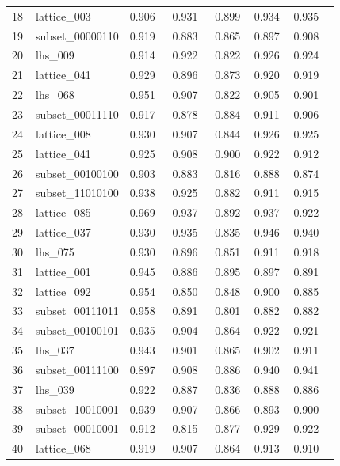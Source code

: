 \begin{longtable}{lp{0.167\linewidth}p{0.133\linewidth}p{0.133\linewidth}p{0.122\linewidth}p{0.122\linewidth}p{0.144\linewidth}}
18 & lattice\_\allowbreak{}003 & 0.906 & 0.931 & 0.899 & 0.934 & 0.935 \\
19 & subset\_\allowbreak{}00000110 & 0.919 & 0.883 & 0.865 & 0.897 & 0.908 \\
20 & lhs\_\allowbreak{}009 & 0.914 & 0.922 & 0.822 & 0.926 & 0.924 \\
21 & lattice\_\allowbreak{}041 & 0.929 & 0.896 & 0.873 & 0.920 & 0.919 \\
22 & lhs\_\allowbreak{}068 & 0.951 & 0.907 & 0.822 & 0.905 & 0.901 \\
23 & subset\_\allowbreak{}00011110 & 0.917 & 0.878 & 0.884 & 0.911 & 0.906 \\
24 & lattice\_\allowbreak{}008 & 0.930 & 0.907 & 0.844 & 0.926 & 0.925 \\
25 & lattice\_\allowbreak{}041 & 0.925 & 0.908 & 0.900 & 0.922 & 0.912 \\
26 & subset\_\allowbreak{}00100100 & 0.903 & 0.883 & 0.816 & 0.888 & 0.874 \\
27 & subset\_\allowbreak{}11010100 & 0.938 & 0.925 & 0.882 & 0.911 & 0.915 \\
28 & lattice\_\allowbreak{}085 & 0.969 & 0.937 & 0.892 & 0.937 & 0.922 \\
29 & lattice\_\allowbreak{}037 & 0.930 & 0.935 & 0.835 & 0.946 & 0.940 \\
30 & lhs\_\allowbreak{}075 & 0.930 & 0.896 & 0.851 & 0.911 & 0.918 \\
31 & lattice\_\allowbreak{}001 & 0.945 & 0.886 & 0.895 & 0.897 & 0.891 \\
32 & lattice\_\allowbreak{}092 & 0.954 & 0.850 & 0.848 & 0.900 & 0.885 \\
33 & subset\_\allowbreak{}00111011 & 0.958 & 0.891 & 0.801 & 0.882 & 0.882 \\
34 & subset\_\allowbreak{}00100101 & 0.935 & 0.904 & 0.864 & 0.922 & 0.921 \\
35 & lhs\_\allowbreak{}037 & 0.943 & 0.901 & 0.865 & 0.902 & 0.911 \\
36 & subset\_\allowbreak{}00111100 & 0.897 & 0.908 & 0.886 & 0.940 & 0.941 \\
37 & lhs\_\allowbreak{}039 & 0.922 & 0.887 & 0.836 & 0.888 & 0.886 \\
38 & subset\_\allowbreak{}10010001 & 0.939 & 0.907 & 0.866 & 0.893 & 0.900 \\
39 & subset\_\allowbreak{}00010001 & 0.912 & 0.815 & 0.877 & 0.929 & 0.922 \\
40 & lattice\_\allowbreak{}068 & 0.919 & 0.907 & 0.864 & 0.913 & 0.910 \\

\end{longtable}
